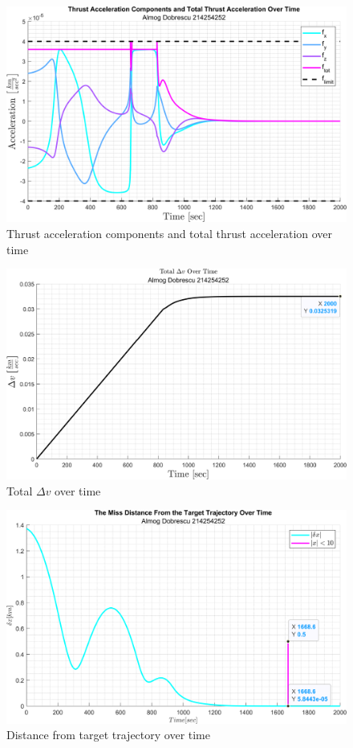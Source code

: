 \documentclass[11pt, a4paper]{article}
\begin{document}
\begin{figure}[H]
    \centering
    \includegraphics[width=1\textwidth]{images/graph3.png}
    \caption{Thrust acceleration components and total thrust acceleration over time}
    \label{fig:accel_over_time}
\end{figure}
\begin{figure}[H]
    \centering
    \includegraphics[width=1\textwidth]{images/graph4.png}
    \caption{Total $\Delta v$ over time}
    \label{fig:delta_v_over_time}
\end{figure}
\begin{figure}[H]
    \centering
    \includegraphics[width=1\textwidth]{images/graph5.png}
    \caption{Distance from target trajectory over time}
    \label{fig:nomr_delx_over_time}
\end{figure}
\end{document}
